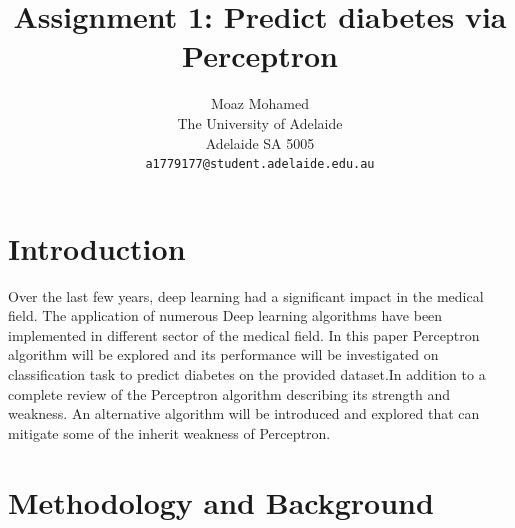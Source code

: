 \documentclass[10pt,twocolumn,letterpaper]{article}
\begin{document}
\title{Assignment 1: Predict diabetes via Perceptron}

\author{Moaz Mohamed\\
The University of Adelaide\\
Adelaide SA 5005\\
{\tt\small a1779177@student.adelaide.edu.au}

}

\maketitle


\section{Introduction}

Over the last few years, deep learning had a significant impact in the medical field. 
The application of numerous Deep learning algorithms have been implemented in different sector of the medical field. In this paper Perceptron algorithm will be explored and its performance will be investigated on classification task to predict diabetes on the provided dataset.In addition to a complete review of the Perceptron algorithm describing its strength and weakness. An alternative algorithm will be introduced and explored that can mitigate some of the inherit weakness of Perceptron. 
\section{Methodology and Background}
\end{document}
